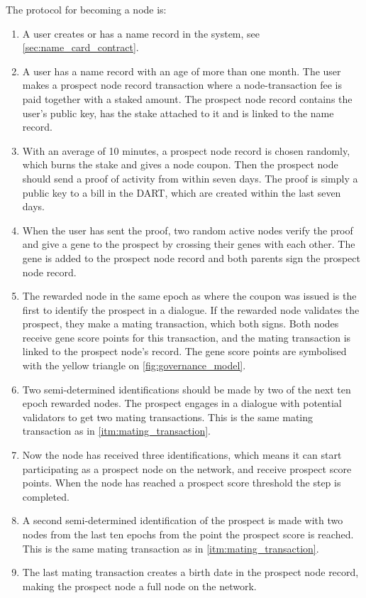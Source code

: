 The protocol for becoming a node is:

\begin{enumerate}
 \item A user creates or has a name record in the system, see \cref{sec:name_card_contract}. 
 
 \item A user has a name record with an age of more than one month. The user makes a prospect node record transaction where a node-transaction fee is paid together with a staked amount. The prospect node record contains the user's public key, has the stake attached to it and is linked to the name record.
 
 \item With an average of 10 minutes, a prospect node record is chosen randomly, which burns the stake and gives a node coupon. Then the prospect node should send a proof of activity from within seven days. The proof is simply a public key to a bill in the DART, which are created within the last seven days. 
 
 \item When the user has sent the proof, two random active nodes verify the proof and give a gene to the prospect by crossing their genes with each other. The gene is added to the prospect node record and both parents sign the prospect node record. 
 
 \item \label{itm:mating_transaction} The rewarded node in the same epoch as where the coupon was issued is the first to identify the prospect in a dialogue. If the rewarded node validates the prospect, they make a mating transaction, which both signs. Both nodes receive gene score points for this transaction, and the mating transaction is linked to the prospect node's record. The gene score points are symbolised with the yellow triangle on \cref{fig:governance_model}. 
 
 \item Two semi-determined identifications should be made by two of the next ten epoch rewarded nodes. The prospect engages in a dialogue with potential validators to get two mating transactions. This is the same mating transaction as in \cref{itm:mating_transaction}.
 
 \item Now the node has received three identifications, which means it can start participating as a prospect node on the network, and receive prospect score points. When the node has reached a prospect score threshold the step is completed. 
 
 \item A second semi-determined identification of the prospect is made with two nodes from the last ten epochs from the point the prospect score is reached. This is the same mating transaction as in \cref{itm:mating_transaction}. 
 
 \item The last mating transaction creates a birth date in the prospect node record, making the prospect node a full node on the network. 
\end{enumerate}


